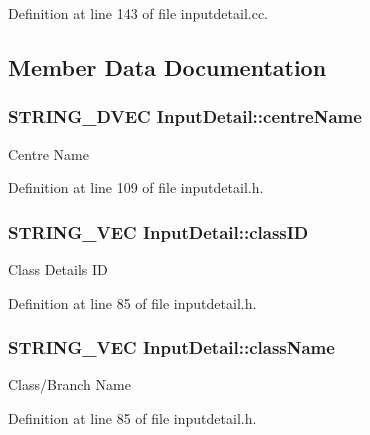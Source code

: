 Definition at line 143 of file inputdetail.\-cc.



\subsection{Member Data Documentation}
\hypertarget{classInputDetail_a44d0e743d84bfce178975192fc2ddde7}{
\subsubsection[{centre\-Name}]{\setlength{\rightskip}{0pt plus 5cm}S\-T\-R\-I\-N\-G\-\_\-D\-V\-E\-C Input\-Detail\-::centre\-Name\hspace{0.3cm}{\ttfamily [protected]}}}\label{classInputDetail_a44d0e743d84bfce178975192fc2ddde7}
Centre Name 

Definition at line 109 of file inputdetail.\-h.

\hypertarget{classInputDetail_a67c823f91164f534250751ab8da7b7cf}{
\subsubsection[{class\-I\-D}]{\setlength{\rightskip}{0pt plus 5cm}S\-T\-R\-I\-N\-G\-\_\-\-V\-E\-C Input\-Detail\-::class\-I\-D\hspace{0.3cm}{\ttfamily [protected]}}}\label{classInputDetail_a67c823f91164f534250751ab8da7b7cf}
Class Details I\-D 

Definition at line 85 of file inputdetail.\-h.

\hypertarget{classInputDetail_a6ee80d01e417bea608374ba83e17b425}{
\subsubsection[{class\-Name}]{\setlength{\rightskip}{0pt plus 5cm}S\-T\-R\-I\-N\-G\-\_\-\-V\-E\-C Input\-Detail\-::class\-Name\hspace{0.3cm}{\ttfamily [protected]}}}\label{classInputDetail_a6ee80d01e417bea608374ba83e17b425}
Class/\-Branch Name 

Definition at line 85 of file inputdetail.\-h.

